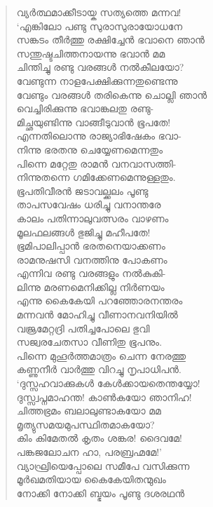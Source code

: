 \begin{verse}
വ്യര്‍ത്ഥമാക്കീടായ്ക സത്യത്തെ മന്നവ!\\
‘എങ്കിലോ പണ്ടു സുരാസുരായോധനേ\\
സങ്കടം തീര്‍ത്തു രക്ഷിച്ചേന്‍ ഭവാനെ ഞാന്‍\\
സന്തുഷ്ടചിത്തനായന്നു ഭവാന്‍ മമ\\
ചിന്തിച്ചു രണ്ടു വരങ്ങള്‍ നല്‍കീലയോ?\\
വേണ്ടുന്ന നാളപേക്ഷിക്കുന്നതുണ്ടെന്നു\\
വേണ്ടും വരങ്ങള്‍ തരികെന്നു ചൊല്ലി ഞാന്‍\\
വെച്ചിരിക്കുന്നു ഭവാങ്കലതു രണ്ടു-\\
മിച്ഛയുണ്ടിന്നു വാങ്ങീടുവാന്‍ ഭൂപതേ!\\
എന്നതിലൊന്നു രാജ്യാഭിഷേകം ഭവാ-\\
നിന്നു ഭരതനു ചെയ്യേണമെന്നതും\\
പിന്നെ മറ്റേതു രാമന്‍ വനവാസത്തി-\\
നിന്നുതന്നെ ഗമിക്കേണമെന്നുള്ളതും.\\
ഭൂപതിവീരന്‍ ജടാവല്ക്കലം പൂണ്ടു\\
താപസവേഷം ധരിച്ചു വനാന്തരേ\\
കാലം പതിന്നാലുവത്സരം വാഴണം\\
മൂലഫലങ്ങള്‍ ഭുജിച്ചു മഹീപതേ!\\
ഭൂമിപാലിപ്പാന്‍ ഭരതനെയാക്കണം\\
രാമനുഷസി വനത്തിനു പോകണം\\
എന്നിവ രണ്ടു വരങ്ങളും നല്‍കുകി-\\
ലിന്നു മരണമെനിക്കില്ല നിര്‍ണയം\\
എന്നു കൈകേയി പറഞ്ഞോരനന്തരം\\
മന്നവന്‍ മോഹിച്ചു വീണാനവനിയില്‍\\
വജ്രമേറ്റദ്രി പതിച്ചപോലെ ഭുവി\\
സജ്വരചേതസാ വീണിതു ഭൂപനും.\\
പിന്നെ മുഹൂര്‍ത്തമാത്രം ചെന്ന നേരത്തു\\
കണ്ണുനീര്‍ വാര്‍ത്തു വിറച്ചു നൃപാധിപന്‍.\\
‘ദുസ്സഹവാക്കുകള്‍ കേള്‍ക്കായതെന്തയ്യോ!\\
ദുസ്സ്വപ്നമാഹന്ത! കാണ്‍കയോ ഞാനിഹ!\\
ചിത്തഭ്രമം ബലാലുണ്ടാകയോ മമ\\
മൃത്യുസമയമുപസ്ഥിതമാകയോ?\\
കിം കിമേതല്‍ കൃതം ശങ്കര! ദൈവമേ!\\
പങ്കജലോചന ഹാ, പരബ്രഹ്മമേ!’\\
വ്യാഘ്രിയെപ്പോലെ സമീപേ വസിക്കുന്ന\\
മൂര്‍ഖമതിയായ കൈകേയിതന്മുഖം\\
നോക്കി നോക്കി ബ്ഭയം പൂണ്ടു ദശരഥന്‍\\

\end{verse}
